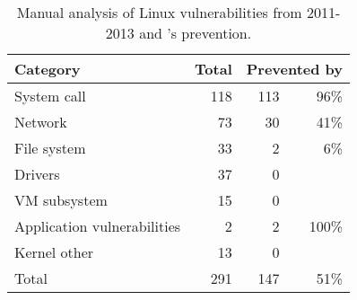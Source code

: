 \begin{table}[t!b!]
\footnotesize
\centering
\begin{tabular}{|l|r|rr|}
\hline
{\bf Category } & {\bf Total} & \multicolumn{2}{|c|}{{\bf Prevented by \sysname{}}}\\

\hline
System call      & 118        &   \hspace{0.2in} 113 &96\% \\\hline 
Network          & 73         &   \hspace{0.2in}30 & 41\% \\\hline 
File system      & 33         &  \hspace{0.2in} 2  & 6\% \\\hline 
Drivers          & 37         &   \hspace{0.2in} 0 &\\\hline 
VM subsystem     & 15         &   \hspace{0.2in} 0 &\\\hline 
Application vulnerabilities & 2   & \hspace{0.2in} 2 & 100\% \\\hline 
Kernel other     & 13      & \hspace{0.2in} 0 &\\\hline 
Total            & 291     & \hspace{0.2in} 147 & 51\% \\\hline 
\end{tabular}
\caption[\sysname{}: analysis of Linux vulnerabilities prevented]
{Manual analysis of Linux vulnerabilities from 2011-2013 and \sysname{}'s prevention.}
\label{table:vulnerabilities}
\end{table}






